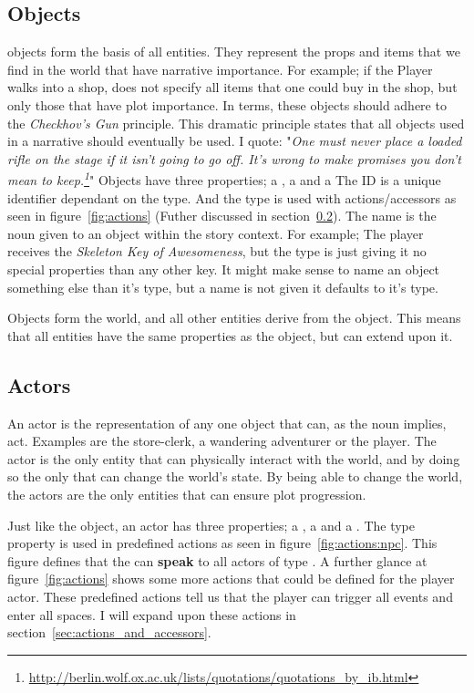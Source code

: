 \subsection{Objects}
\diage objects form the basis of all entities.
They represent the props and items that we find in the world that have narrative importance.
For example; if the Player walks into a shop, \diage does not specify all items that one could buy in the shop, but only those that have plot importance.
In terms, these objects should adhere to the \textit{Checkhov's Gun} principle.
This dramatic principle states that all objects used in a narrative should eventually be used.
I quote: "\textit{One must never place a loaded rifle on the stage if it isn't going to go off.
It's wrong to make promises you don't mean to keep.\footnote{\url{http://berlin.wolf.ox.ac.uk/lists/quotations/quotations_by_ib.html}}}"
Objects have three properties; a , a  and a  The ID is a unique identifier dependant on the type.
And the type is used with actions/accessors as seen in figure~\ref{fig:actions} (Futher discussed in section~\ref{sec:actors}).
The name is the noun given to an object within the story context.
For example; The player receives the \textit{Skeleton Key of Awesomeness}, but the type is just  giving it no special properties than any other key.
It might make sense to name an object something else than it's type, but a name is not given it defaults to it's type.

Objects form the world, and all other entities derive from the \diage object.
This means that all entities have the same properties as the object, but can extend upon it.
\subsection{Actors}
\label{sec:actors}
An actor is the representation of any one object that can, as the noun implies, act.
Examples are the store-clerk, a wandering adventurer or the player.
The actor is the only entity that can physically interact with the world, and by doing so the only that can change the world's state.
By being able to change the world, the actors are the only entities that can ensure plot progression.

Just like the object, an actor has three properties; a , a  and a .
The type property is used in predefined actions as seen in figure~\ref{fig:actions:npc}.
This figure defines that the  can \textbf{speak} to all actors of type .
A further glance at figure~\ref{fig:actions} shows some more actions that could be defined for the player actor.
These predefined actions tell us that the player can trigger all events and enter all spaces.
I will expand upon these actions in section~\ref{sec:actions_and_accessors}.

